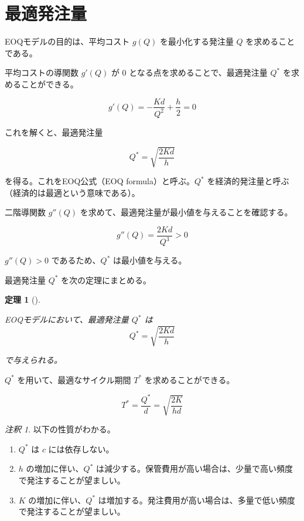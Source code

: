 \documentclass[
  japanese,
  letterpaper,
]{ltjbook}
\providecommand{\tightlist}{%
  \setlength{\itemsep}{0pt}\setlength{\parskip}{0pt}}
\theoremstyle{plain}
\newtheorem{theorem}{定理}[chapter]
\theoremstyle{definition}
\theoremstyle{remark}
\newtheorem{refremark}{注釈}[chapter]
\begin{document}
\section{最適発注量}\label{ux6700ux9069ux767aux6ce8ux91cf}

EOQモデルの目的は、平均コスト \(g(Q)\) を最小化する発注量 \(Q\)
を求めることである。

平均コストの導関数 \(g'(Q)\) が 0 となる点を求めることで、最適発注量
\(Q^*\) を求めることができる。

\[
g'(Q) = -\frac{Kd}{Q^2} + \frac{h}{2} = 0
\]

これを解くと、最適発注量

\[
Q^* = \sqrt{\frac{2Kd}{h}}
\]

を得る。これをEOQ公式（EOQ formula）と呼ぶ。\(Q^*\)
を経済的発注量と呼ぶ（経済的は最適という意味である）。

二階導関数 \(g''(Q)\)
を求めて、最適発注量が最小値を与えることを確認する。

\[
g''(Q) = \frac{2Kd}{Q^3} > 0
\]

\(g''(Q) > 0\) であるため、\(Q^*\) は最小値を与える。

最適発注量 \(Q^*\) を次の定理にまとめる。

\begin{theorem}[]\protect\hypertarget{thm-eoq}{}\label{thm-eoq}

EOQモデルにおいて、最適発注量 \(Q^*\) は \[
Q^* = \sqrt{\frac{2Kd}{h}}
\]

で与えられる。

\end{theorem}

\(Q^*\) を用いて、最適なサイクル期間 \(T^*\) を求めることができる。

\[
T^* = \frac{Q^*}{d} = \sqrt{\frac{2K}{hd}}
\]

\begin{refremark}
以下の性質がわかる。

\begin{enumerate}
\def\labelenumi{\arabic{enumi}.}
\tightlist
\item
  \(Q^*\) は \(c\) には依存しない。
\item
  \(h\) の増加に伴い、\(Q^*\)
  は減少する。保管費用が高い場合は、少量で高い頻度で発注することが望ましい。
\item
  \(K\) の増加に伴い、\(Q^*\)
  は増加する。発注費用が高い場合は、多量で低い頻度で発注することが望ましい。
\end{enumerate}

\label{rem-eoq-properties}

\end{refremark}
\end{document}
